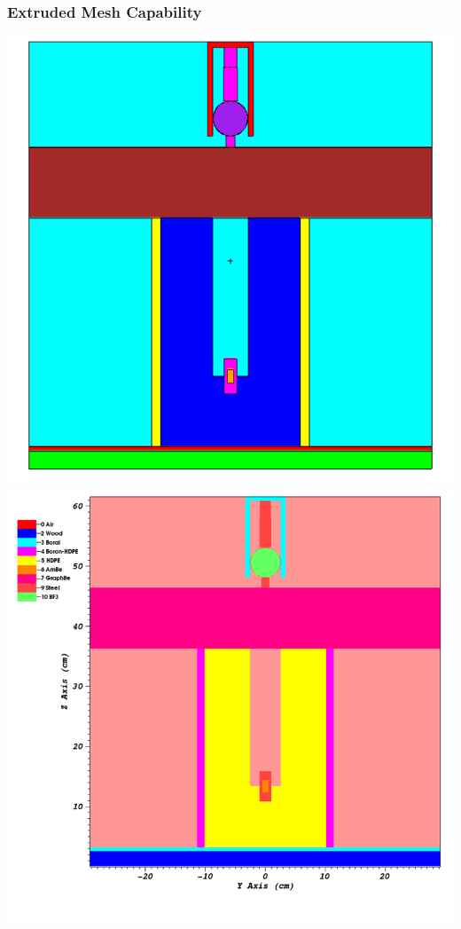 \documentclass[compress]{beamer}
\begin{document}
\begin{frame}[t]\frametitle{Extruded Mesh Capability}
\centering
\includegraphics[scale=0.23]{figures/IM1_MCNP}
\includegraphics[scale=0.23]{figures/IM1_PDT}
\end{frame}
\end{document}
